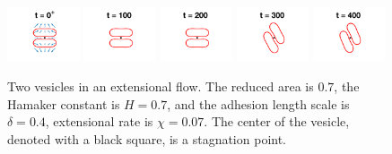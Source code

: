 \documentclass[prf,superscriptaddress,showpacs]{revtex4-1}
\begin{document}
\begin{figure}[htp]
  \includegraphics[width = 0.19\textwidth,trim={5cm 2cm 5cm 1cm},clip]{figs/extensional_adR4em1adS7em1Chi7em2_ra070_image01.png}
  \includegraphics[width = 0.19\textwidth,trim={5cm 2cm 5cm 1cm},clip]{figs/extensional_adR4em1adS7em1Chi7em2_ra070_image02.png}
  \includegraphics[width = 0.19\textwidth,trim={5cm 2cm 5cm 1cm},clip]{figs/extensional_adR4em1adS7em1Chi7em2_ra070_image03.png}
  \includegraphics[width = 0.19\textwidth,trim={5cm 2cm 5cm 1cm},clip]{figs/extensional_adR4em1adS7em1Chi7em2_ra070_image04.png}
  \includegraphics[width = 0.19\textwidth,trim={5cm 2cm 5cm 1cm},clip]{figs/extensional_adR4em1adS7em1Chi7em2_ra070_image05.png}
  \caption{\label{fig:extensional2} Two vesicles in an extensional flow.
  The reduced area is $0.7$, the Hamaker constant is $H = 0.7$, and the
  adhesion length scale is $\delta = 0.4$, extensional rate is $\chi =
  0.07$.  The center of the vesicle, denoted with a black square, is a
  stagnation point.}
\end{figure}
\end{document}
